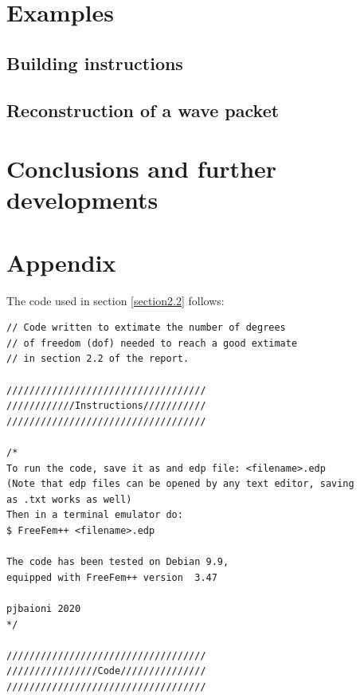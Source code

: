 \documentclass[12pt, a4paper]{report}
\theoremstyle{definition}
\begin{document}
{\chapter{Examples}\label{chapter4}

\section{Building instructions}
\section{Reconstruction of a wave packet}



\chapter*{Conclusions and further developments}




\appendix
\chapter*{Appendix}\label{appendix}
The code used in section \ref{section2.2} follows:
\begin{lstlisting}[language=FreeFem++, frame=single, name=extimate_dof, showstringspaces=false]
// Code written to extimate the number of degrees 
// of freedom (dof) needed to reach a good extimate
// in section 2.2 of the report.

///////////////////////////////////
////////////Instructions///////////
///////////////////////////////////

/*	
To run the code, save it as and edp file: <filename>.edp
(Note that edp files can be opened by any text editor, saving
as .txt works as well)
Then in a terminal emulator do:
$ FreeFem++ <filename>.edp

The code has been tested on Debian 9.9,
equipped with FreeFem++ version  3.47 

pjbaioni 2020
*/

///////////////////////////////////
////////////////Code///////////////
///////////////////////////////////


\end{lstlisting}}
\end{document}
